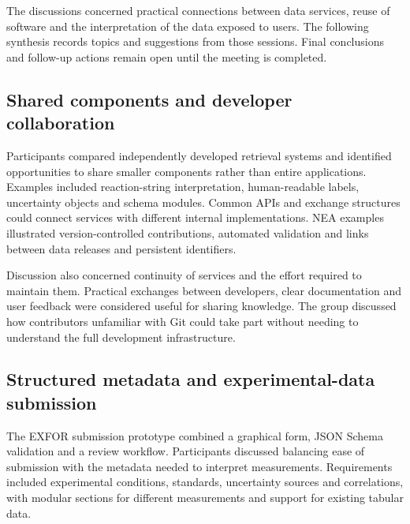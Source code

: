 
The discussions concerned practical connections between data services, reuse of software and the interpretation of the data exposed to users. The following synthesis records topics and suggestions from those sessions. Final conclusions and follow-up actions remain open until the meeting is completed.

\subsection{Shared components and developer collaboration}
Participants compared independently developed retrieval systems and identified opportunities to share smaller components rather than entire applications. Examples included reaction-string interpretation, human-readable labels, uncertainty objects and schema modules. Common APIs and exchange structures could connect services with different internal implementations. NEA examples illustrated version-controlled contributions, automated validation and links between data releases and persistent identifiers.

Discussion also concerned continuity of services and the effort required to maintain them. Practical exchanges between developers, clear documentation and user feedback were considered useful for sharing knowledge. The group discussed how contributors unfamiliar with Git could take part without needing to understand the full development infrastructure.

\subsection{Structured metadata and experimental-data submission}
The EXFOR submission prototype combined a graphical form, JSON Schema validation and a review workflow. Participants discussed balancing ease of submission with the metadata needed to interpret measurements. Requirements included experimental conditions, standards, uncertainty sources and correlations, with modular sections for different measurements and support for existing tabular data.

